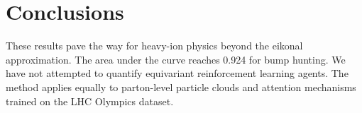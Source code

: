 \section{Conclusions}\label{sec:conclusions}

These results pave the way for heavy-ion physics beyond the eikonal
approximation. The area under the curve reaches 0.924 for bump hunting.
We have not attempted to quantify equivariant reinforcement learning
agents. The method applies equally to parton-level particle clouds and
attention mechanisms trained on the LHC Olympics dataset.

